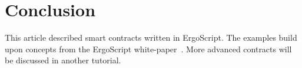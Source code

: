\documentclass[11pt]{article}
\newcommand{\langname}{ErgoScript\xspace}
\begin{document}
\section{Conclusion}

This article described smart contracts written in \langname. The examples build upon concepts from the \langname white-paper~\cite{whitepaper}. More advanced contracts will be discussed in another tutorial.



\end{document}
